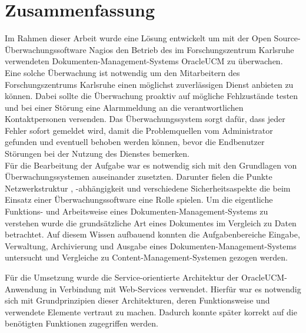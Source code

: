 \section{Zusammenfassung}

Im Rahmen dieser Arbeit wurde eine Lösung entwickelt um mit der Open Source-Überwachungssoftware Nagios den Betrieb des im Forschungszentrum Karlsruhe verwendeten Dokumenten-Management-Systems \gls{OracleUCM} zu überwachen.
Eine solche Überwachung ist notwendig um den Mitarbeitern des Forschungszentrums Karlsruhe einen möglichst zuverlässigen Dienst anbieten zu können.
Dabei sollte die Überwachung proaktiv auf mögliche Fehlzustände testen und bei einer Störung eine Alarmmeldung an die verantwortlichen Kontaktpersonen versenden. 
Das Überwachungssystem sorgt dafür, dass jeder Fehler sofort gemeldet wird, damit die Problemquellen vom Administrator gefunden und eventuell behoben werden können, bevor die Endbenutzer Störungen bei der Nutzung des Dienstes bemerken.\\

Für die Bearbeitung der Aufgabe war es notwendig sich mit den Grundlagen von Überwachungssystemen auseinander zusetzten.
Darunter fielen die Punkte Netzwerkstruktur , -abhängigkeit und verschiedene Sicherheitsaspekte die beim Einsatz einer Überwachungssoftware eine Rolle spielen.
Um die eigentliche Funktions- und Arbeitsweise eines Dokumenten-Management-Systems zu verstehen wurde die grundsätzliche Art eines Dokumentes im Vergleich zu Daten betrachtet.
Auf diesem Wissen aufbauend konnten die Aufgabenbereiche Eingabe, Verwaltung, Archivierung und Ausgabe eines Dokumenten-Management-Systems untersucht und Vergleiche zu Content-Management-Systemen gezogen werden.

Für die Umsetzung wurde die Service-orientierte Architektur der \gls{OracleUCM}-Anwendung in Verbindung mit Web-Services verwendet.
Hierfür war es notwendig sich mit Grundprinzipien dieser Architekturen, deren Funktionsweise und verwendete Elemente vertraut zu machen.
Dadurch konnte später korrekt auf die benötigten Funktionen zugegriffen werden.\\

